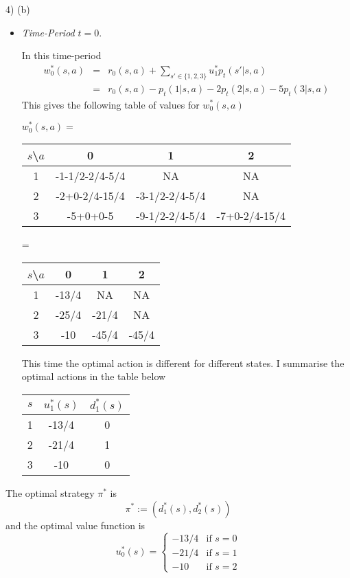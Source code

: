 \documentclass[11pt,a4paper]{article}
\begin{document}
\begin{answer}{4) (b)}
\begin{itemize}
    \item \textit{Time-Period} $t=0$.
    \par In this time-period
    \[\begin{array}{rcl}
      w_0^*(s,a)&=&r_0(s,a)+\sum_{s'\in\{1,2,3\}}u_1^*p_t(s'|s,a)\\
                &=&r_0(s,a)-p_t(1|s,a)-2p_t(2|s,a)-5p_t(3|s,a)
    \end{array}\]
    This gives the following table of values for $w_0^*(s,a)$
    \begin{adjustwidth}{-2cm}{-2cm}
        $w_0^*(s,a)=$
        \begin{tabular}{c|ccc}
          $s$\textbackslash $a$&0&1&2\\\hline
          1&-1-1/2-2/4-5/4&NA&NA\\
          2&-2+0-2/4-15/4&-3-1/2-2/4-5/4&NA\\
          3&-5+0+0-5&-9-1/2-2/4-5/4&-7+0-2/4-15/4
        \end{tabular}
        =
        \begin{tabular}{c|ccc}
          $s$\textbackslash $a$&0&1&2\\\hline
          1&-13/4&NA&NA\\
          2&-25/4&-21/4&NA\\
          3&-10&-45/4&-45/4
        \end{tabular}
    \end{adjustwidth}
    This time the optimal action is different for different states. I summarise the optimal actions in the table below
    \begin{center}
      \begin{tabular}{c|c|c}
        $s$&$u_1^*(s)$&$d_1^*(s)$\\\hline
        1&-13/4&0\\
        2&-21/4&1\\
        3&-10&0
      \end{tabular}
    \end{center}
  \end{itemize}
  The optimal strategy $\pi^*$ is
  \[ \pi^*:=(d_1^*(s),d_2^*(s)) \]
  and the optimal value function is
  \[
     u_0^*(s)=\begin{cases}
                -13/4&\text{if }s=0\\
                -21/4&\text{if }s=1\\
                -10&\text{if }s=2
              \end{cases}
  \]

\end{answer}
\end{document}
